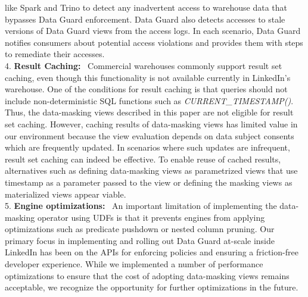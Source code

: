 like Spark and Trino to detect any inadvertent access to warehouse data that bypasses Data Guard enforcement. 
Data Guard also detects accesses to stale versions of Data Guard views from the access logs. 
In each scenario, Data Guard notifies consumers about potential access violations and provides them with steps to remediate their accesses. \\
4. {\bf Result Caching: }\ 
Commercial warehouses commonly support result set caching, even though this functionality is not available currently in LinkedIn's warehouse. One of the conditions for result caching is that queries should not include non-deterministic SQL functions such as {\em CURRENT\_TIMESTAMP()}. Thus, the data-masking views described in this paper are not eligible for result set caching. However, caching results of data-masking views has limited value in our environment because the view evaluation depends on data subject consents which are frequently updated. In scenarios where such updates are infrequent, result set caching can indeed be effective. To enable reuse of cached results, alternatives such as defining data-masking views as parametrized views that use timestamp as a parameter passed to the view or defining the masking views as materialized views appear viable.  \\
5. {\bf Engine optimizations: }\ An important limitation of implementing the data-masking operator using UDFs is that it prevents engines from applying optimizations such as predicate pushdown or nested column pruning. Our primary focus in implementing and rolling out Data Guard at-scale inside LinkedIn has been on the APIs for enforcing policies and ensuring a friction-free developer experience. While we implemented a number of performance optimizations to ensure that the cost of adopting data-masking views remains acceptable, we recognize the opportunity for further optimizations in the future. 